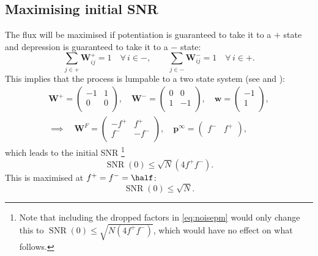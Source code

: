 \documentclass[12pt]{article}
\newcommand{\I}{\mathbf{I}}
\newcommand{\eq}{\mathbf{p}^\infty}
\newcommand{\w}{\mathbf{w}}
\newcommand{\W}{\mathbf{W}}
\DeclareMathOperator{\SNR}{SNR}
\begin{document}
\subsection{Maximising initial SNR}\label{sec:initmax}

The flux will be maximised if potentiation is guaranteed to take it to a $+$ state and depression is guaranteed to take it to a $-$ state:
%
\begin{equation}\label{eq:guarantee}
  \sum_{j\in+} \W^+_{ij} = 1 \quad \forall\, i\in-,
  \qquad
  \sum_{j\in-} \W^-_{ij} = 1 \quad \forall\, i\in+.
\end{equation}
%
This implies that the process is lumpable to a two state system (see  and ):
%
\begin{multline}\label{eq:binarylump}
  \W^+ = \begin{pmatrix}
           -1 & 1 \\
           0 & 0 \\
         \end{pmatrix}
  ,\quad
  \W^- = \begin{pmatrix}
           0 & 0 \\
           1 & -1 \\
         \end{pmatrix}
  ,\quad
  \w = \begin{pmatrix}
           -1 \\
           1 \\
         \end{pmatrix}
  ,\\ \implies\quad
  \W^F = \begin{pmatrix}
           -f^+ & f^+ \\
           f^- & -f^- \\
         \end{pmatrix}
  ,\quad
  \eq = \begin{pmatrix}
           f^- & f^+ \\
         \end{pmatrix}
  ,%
\end{multline}
%
which leads to the initial SNR %
\footnote{Note that including the dropped factors in \eqref{eq:noisepm} would only change this to
$\SNR(0) \leq \sqrt{N (4f^+f^-)}$,
which would have no effect on what follows.}
%
\begin{equation}\label{eq:binarySNR}
  \SNR(0) \leq \sqrt{N} (4f^+f^-) .
\end{equation}
%
This is maximised at $f^+=f^-=\half$:
%
\begin{equation}\label{eq:initmax}
  \SNR(0) \leq \sqrt{N}.
\end{equation}
%
\end{document}
